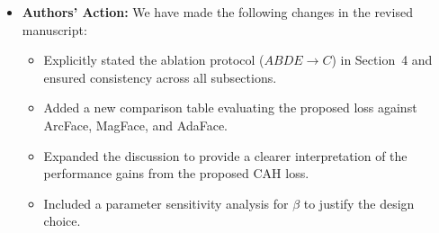 \documentclass[11pt]{article}
\theoremstyle{remark}
\begin{document}
\begin{itemize}
	\item \textbf{Authors' Action:} 
	We have made the following changes in the revised manuscript:
	\begin{itemize}
	    \item Explicitly stated the ablation protocol ($ABDE \rightarrow C$) in Section~4 and ensured consistency across all subsections.
	    \item Added a new comparison table evaluating the proposed loss against ArcFace, MagFace, and AdaFace.
	    \item Expanded the discussion to provide a clearer interpretation of the performance gains from the proposed CAH loss.
	    \item Included a parameter sensitivity analysis for $\beta$ to justify the design choice.
	\end{itemize}
\end{itemize}


\end{document}
